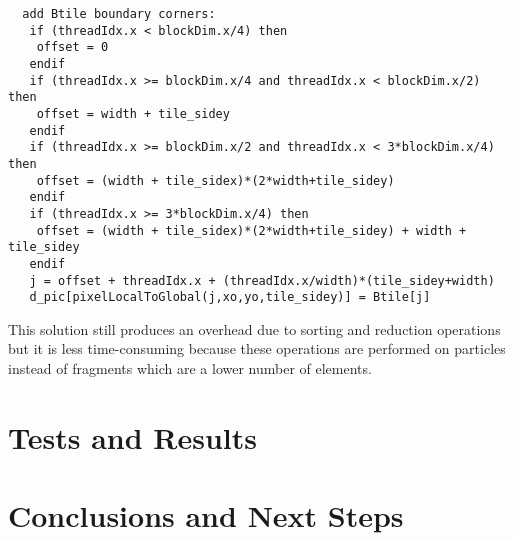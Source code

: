 \documentclass[11pt]{article}
\begin{document}
\begin{verbatim}
  add Btile boundary corners:
   if (threadIdx.x < blockDim.x/4) then
    offset = 0
   endif
   if (threadIdx.x >= blockDim.x/4 and threadIdx.x < blockDim.x/2) then
    offset = width + tile_sidey
   endif
   if (threadIdx.x >= blockDim.x/2 and threadIdx.x < 3*blockDim.x/4) then
    offset = (width + tile_sidex)*(2*width+tile_sidey)
   endif
   if (threadIdx.x >= 3*blockDim.x/4) then
    offset = (width + tile_sidex)*(2*width+tile_sidey) + width + tile_sidey
   endif
   j = offset + threadIdx.x + (threadIdx.x/width)*(tile_sidey+width)
   d_pic[pixelLocalToGlobal(j,xo,yo,tile_sidey)] = Btile[j]

\end{verbatim}
\normalsize
This solution still produces an overhead due to sorting and reduction operations but it is less time-consuming because these operations are performed on particles instead of fragments which are a lower number of elements.   

\section{Tests and Results}

\section{Conclusions and Next Steps}
\end{document}
